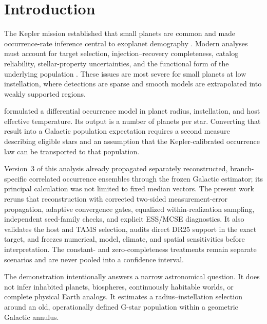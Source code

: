 \documentclass[twocolumn,linenumbers]{aastex702}
\begin{document}

\section{Introduction}\label{sec:intro}

The Kepler mission established that small planets are common and made
occurrence-rate inference central to exoplanet demography
\citep[e.g.,][]{Howard2012,Fressin2013,Petigura2013}. Modern analyses must
account for target selection, injection--recovery completeness, catalog
reliability, stellar-property uncertainties, and the functional form of the
underlying population \citep{Burke2015,ForemanMackey2014,Kunimoto2020}. These
issues are most severe for small planets at low instellation, where detections
are sparse and smooth models are extrapolated into weakly supported regions.

\citet{Bryson2021} formulated a differential occurrence model in planet
radius, instellation, and host effective temperature. Its output is a number
of planets per star. Converting that result into a Galactic population
expectation requires a second measure describing eligible stars and an
assumption that the Kepler-calibrated occurrence law can be transported to
that population.

Version~3 of this analysis already propagated separately reconstructed,
branch-specific correlated occurrence ensembles through the frozen Galactic
estimator; its principal calculation was not limited to fixed median vectors.
The present work reruns that reconstruction with corrected two-sided
measurement-error propagation, adaptive convergence gates, equalized
within-realization sampling, independent seed-family checks, and explicit
ESS/MCSE diagnostics. It also validates the host and TAMS selection, audits
direct DR25 support in the exact target, and freezes numerical, model, climate,
and spatial sensitivities before interpretation. The constant- and
zero-completeness treatments remain separate scenarios and are never pooled
into a confidence interval.

The demonstration intentionally answers a narrow astronomical question. It
does not infer inhabited planets, biospheres, continuously habitable worlds,
or complete physical Earth analogs. It estimates a radius--instellation
selection around an old, operationally defined G-star population within a
geometric Galactic annulus.
\end{document}
